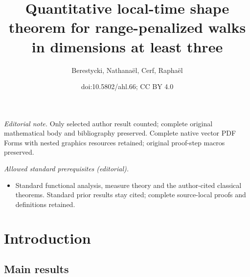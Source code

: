 \documentclass[10pt]{amsart}
\title{Quantitative local-time shape theorem for range-penalized walks in dimensions at least three}
\author{Berestycki, Nathanaël, Cerf, Raphaël}
\date{doi:10.5802/ahl.66; CC BY 4.0}
\theoremstyle{definition}\newtheorem{defi}[theo]{Definition}\newtheorem{rema}[theo]{Remark}\newtheorem{exam}[theo]{Example}\newtheorem{exem}[theo]{Example}\newtheorem{nota}[theo]{Notation}
\begin{document}
\maketitle
\noindent\textit{Editorial note.} Only selected author result counted; complete original mathematical body and bibliography preserved. Complete native vector PDF Forms with nested graphics resources retained; original proof-step macros preserved.\par\medskip
\noindent\textit{Allowed standard prerequisites (editorial).}\begin{itemize}
\item Standard functional analysis, measure theory and the author-cited classical theorems. Standard prior results stay cited; complete source-local proofs and definitions retained.
\end{itemize}\medskip


\pagebreak
\tableofcontents
\pagebreak
\section{Introduction}

\subsection{Main results}
\end{document}
